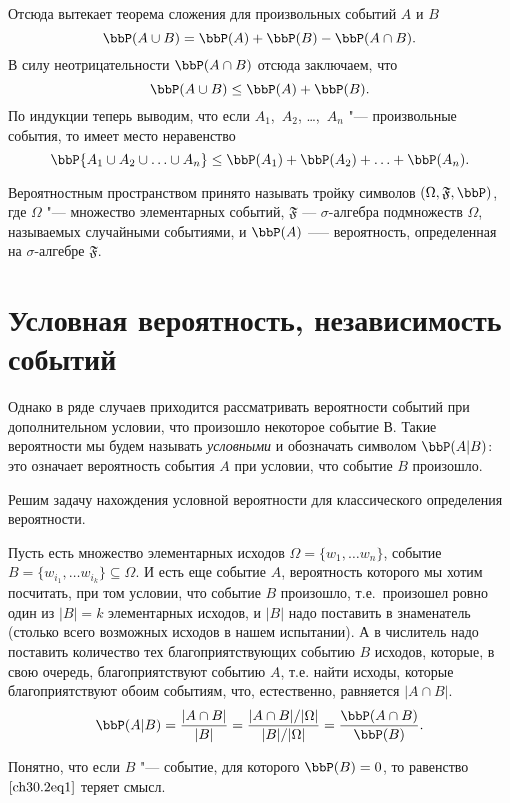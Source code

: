 Отсюда вытекает теорема сложения для произвольных событий $A$ и $B$
$$
\bbP(A \cup B) = \bbP(A) + \bbP(B) - \bbP(A\cap B).
$$
В силу неотрицательности $\bbP(A\cap B)$ отсюда заключаем, что
$$
\bbP(A \cup B) \le \bbP(A) + \bbP(B).
$$
По индукции теперь выводим, что если $A_1$,~$A_2$, \ldots,~$A_n$ "--- произвольные события, то имеет место неравенство
$$
\bbP\{ A_1 \cup A_2 \cup \ldots \cup A_n \} \le \bbP(A_1) + \bbP(A_2) + \ldots + \bbP(A_n).
$$

Вероятностным пространством принято называть тройку символов $(\Omega, \mathfrak{F}, \bbP)$, где $\Omega$ "--- множество элементарных событий, $\mathfrak{F}$ — $\sigma$-алгебра подмножеств $\Omega$, называемых случайными событиями, и $\bbP(A)$ --— вероятность, определенная на $\sigma$-алгебре $\mathfrak{F}$.

\section{Условная вероятность, независимость событий}

Однако в ряде случаев приходится рассматривать вероятности событий при дополнительном условии, что произошло некоторое событие В. Такие вероятности мы будем называть \textit{условными} и обозначать символом $\bbP(A|B)$: это означает вероятность события $A$ при условии, что событие $B$ произошло.
 
Решим задачу нахождения условной вероятности для классического определения вероятности.

Пусть есть множество элементарных исходов $\Omega=\{w_1,\dots w_n\}$, событие $B=\{w_{i_1},\dots w_{i_k}\} \subseteq \Omega$. И есть еще событие $A$, вероятность которого мы хотим посчитать, при том условии, что событие $B$ произошло, т.е.~произошел ровно один из $|B|=k$ элементарных исходов, и $|B|$ надо поставить в знаменатель (столько всего возможных исходов в нашем испытании). А в числитель надо поставить количество тех благоприятствующих событию $B$ исходов, которые, в свою очередь, благоприятствуют событию $A$, т.е. найти исходы, которые благоприятствуют обоим событиям, что, естественно, равняется $|A\cap B|$.
\begin{equation} \label{ch30.2eq1}
\bbP(A|B) = \frac{|A\cap B|}{|B|} = \frac{|A\cap B|/|\Omega|}{|B|/|\Omega|} = \frac{\bbP(A\cap B)}{\bbP(B)}.
\end{equation}

Понятно, что если $B$ "--- событие, для которого $\bbP(B)=0$, то равенство~$\eqref{ch30.2eq1}$ теряет смысл.

